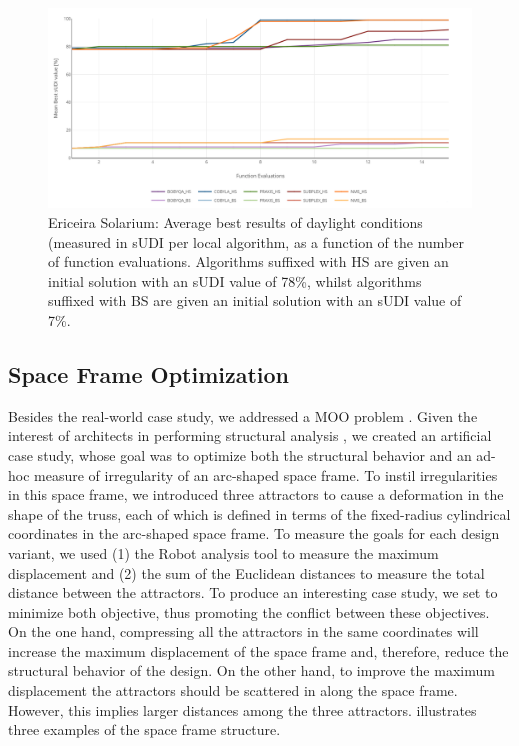 \begin{figure}[htbp]
	\centering
	\includegraphics[width=\textwidth]{Images/Evaluation/Ericeira_results_ph2.PNG}
	\caption[Ericeira Solarium: Average best results of daylight conditions (measured in \ac{sUDI}) per local algorithm]{Ericeira Solarium: Average best results of daylight conditions (measured in \ac{sUDI} per local algorithm, as a function of the number of function evaluations. Algorithms suffixed with HS are given an initial solution with an sUDI value of 78\%, whilst algorithms suffixed with BS are given an initial solution with an sUDI value of 7\%.}
	\label{fig:phase2results}
\end{figure}


\subsection{Space Frame Optimization}

Besides the real-world case study, we addressed a \ac{MOO} problem \cite{Belem2019MOO}. Given the interest of architects in performing structural analysis \cite{Cichocka2017SURVEY}, we created an artificial case study, whose goal was to optimize both the structural behavior and an ad-hoc measure of irregularity of an arc-shaped space frame. To instil irregularities in this space frame, we introduced three attractors to cause a deformation in the shape of the truss, each of which is defined in terms of the fixed-radius cylindrical coordinates in the arc-shaped space frame. To measure the goals for each design variant, we used (1) the Robot analysis tool to measure the maximum displacement and (2) the sum of the Euclidean distances to measure the total distance between the attractors. To produce an interesting case study, we set to minimize both objective, thus promoting the conflict between these objectives. On the one hand, compressing all the attractors in the same coordinates will increase the maximum displacement of the space frame and, therefore, reduce the structural behavior of the design. On the other hand,  to improve the maximum displacement the attractors should be scattered in along the space frame. However, this implies larger distances among the three attractors.  illustrates three examples of the space frame structure. 

